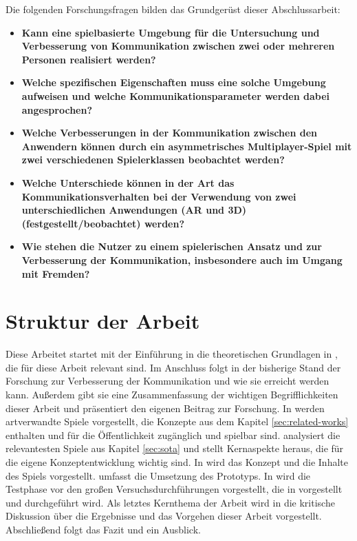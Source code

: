 Die folgenden Forschungsfragen bilden das Grundgerüst dieser Abschlussarbeit:


\begin{itemize}
    \item \textbf{Kann eine spielbasierte Umgebung für die Untersuchung und Verbesserung von Kommunikation zwischen zwei oder mehreren Personen realisiert werden?}
    \item \textbf{Welche spezifischen Eigenschaften muss eine solche Umgebung aufweisen und welche Kommunikationsparameter werden dabei angesprochen?}
    \item \textbf{Welche Verbesserungen in der Kommunikation zwischen den Anwendern können durch ein asymmetrisches Multiplayer-Spiel mit zwei verschiedenen Spielerklassen beobachtet werden?}
    \item \textbf{Welche Unterschiede können in der Art das Kommunikationsverhalten bei der Verwendung von zwei unterschiedlichen Anwendungen (AR und 3D) (festgestellt/beobachtet) werden?}
    \item \textbf{Wie stehen die Nutzer zu einem spielerischen Ansatz und zur Verbesserung der Kommunikation, insbesondere auch im Umgang mit Fremden?}
\end{itemize}

\section{Struktur der Arbeit}
Diese Arbeitet startet mit der Einführung in die theoretischen Grundlagen in , die für diese Arbeit relevant sind. Im Anschluss folgt in  der bisherige Stand der Forschung zur Verbesserung der Kommunikation und wie sie erreicht werden kann. Außerdem gibt sie eine Zusammenfassung der wichtigen Begrifflichkeiten dieser Arbeit und präsentiert den eigenen Beitrag zur Forschung. In  werden artverwandte Spiele vorgestellt, die Konzepte aus dem Kapitel \ref{sec:related-works} enthalten und für die Öffentlichkeit zugänglich und spielbar sind.  analysiert die relevantesten Spiele aus Kapitel \ref{sec:sota} und stellt Kernaspekte heraus, die für die eigene Konzeptentwicklung wichtig sind. In  wird das Konzept und die Inhalte des Spiels vorgestellt.  umfasst die Umsetzung des Prototyps. In  wird die Testphase vor den großen Versuchsdurchführungen vorgestellt, die in  vorgestellt und durchgeführt wird. Als letztes Kernthema der Arbeit wird in  die kritische Diskussion über die Ergebnisse und das Vorgehen dieser Arbeit vorgestellt. Abschließend folgt das Fazit und ein Ausblick.
